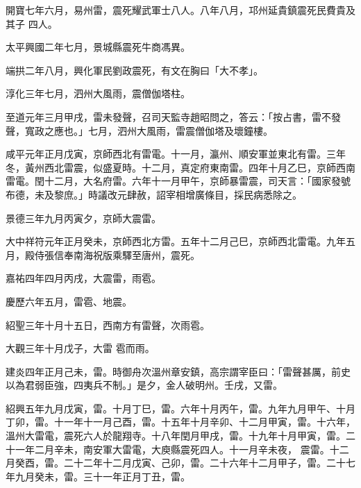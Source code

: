 \begin{pinyinscope}
 開寶七年六月，易州雷，震死耀武軍士八人。八年八月，邛州延貴鎮震死民費貴及其子
 四人。



 太平興國二年七月，景城縣震死牛商馮異。



 端拱二年八月，興化軍民劉政震死，有文在胸曰「大不孝」。



 淳化三年七月，泗州大風雨，震僧伽塔柱。



 至道元年三月甲戌，雷未發聲，召司天監寺趙昭問之，答云：「按占書，雷不發聲，寬政之應也。」七月，泗州大風雨，雷震僧伽塔及壞鐘樓。



 咸平元年正月戊寅，京師西北有雷電。十一月，瀛州、順安軍並東北有雷。三年冬，黃州西北雷震，似盛夏時。十二月，真定府東南雷。四年十月乙巳，京師西南
 雷電。閏十二月，大名府雷。六年十一月甲午，京師暴雷震，司天言：「國家發號布德，未及黎庶。」時議改元肆赦，詔宰相增廣條目，採民病悉除之。



 景德三年九月丙寅夕，京師大震雷。



 大中祥符元年正月癸未，京師西北方雷。五年十二月己巳，京師西北雷電。九年五月，殿侍張信奉南海祝版乘驛至唐州，震死。



 嘉祐四年四月丙戌，大震雷，雨雹。



 慶歷六年五月，雷雹、地震。



 紹聖三年十月十五日，西南方有雷聲，次雨雹。



 大觀三年十月戊子，大雷
 雹而雨。



 建炎四年正月己未，雷。時御舟次溫州章安鎮，高宗謂宰臣曰：「雷聲甚厲，前史以為君弱臣強，四夷兵不制。」是夕，金人破明州。壬戌，又雷。



 紹興五年九月戊寅，雷。十月丁巳，雷。六年十月丙午，雷。九年九月甲午、十月丁卯，雷。十一年十一月己酉，雷。十五年十月辛卯、十二月甲寅，雷。十六年，溫州大雷電，震死六人於龍翔寺。十八年閏月甲戌，雷。十九年十月甲寅，雷。二十一年二月辛未，南安軍大雷電，大庾縣震死四人。十一月辛未夜，
 震雷。十二月癸酉，雷。二十二年十二月戊寅、己卯，雷。二十六年十二月甲子，雷。二十七年九月癸未，雷。三十一年正月丁丑，雷。




\end{pinyinscope}
